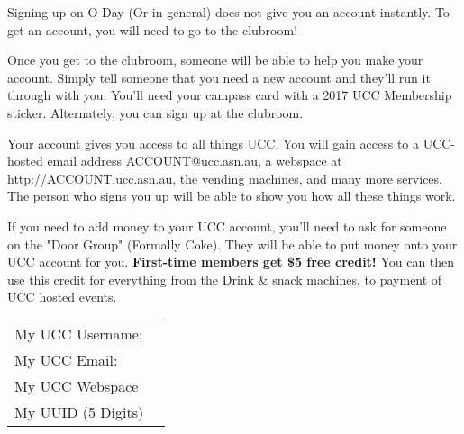 
Signing up on O-Day (Or in general) does not give you an account instantly. To get an account, you will need to go to the clubroom!

Once you get to the clubroom, someone will be able to help you make your account. Simply tell someone that you need a new account and they'll run it through with you. You'll need your campass card with a 2017 UCC Membership sticker. Alternately, you can sign up at the clubroom.

Your account gives you access to all things UCC. You will gain access to a UCC-hosted email address \url{ACCOUNT@ucc.asn.au}, a webspace at \url{http://ACCOUNT.ucc.asn.au}, the vending machines, and many more services. The person who signs you up will be able to show you how all these things work.

If you need to add money to your UCC account, you'll need to ask for someone on the "Door Group" (Formally Coke). They will be able to put money onto your UCC account for you. \textbf{First-time members get \$5 free credit!} You can then use this credit for everything from the Drink \& snack machines, to payment of UCC hosted events.

\begin{table}[b]
\begin{tabular}{| l | p{7.5cm} |}
	\hline
	My UCC Username: & \\[10px]
	My UCC Email: & \\[10px]
	My UCC Webspace & \\[10px]
	My UUID (5 Digits) & \\[10px]
	\hline
\end{tabular}
\end{table}
